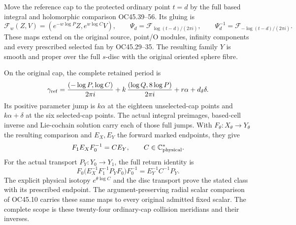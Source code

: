 \begin{theorem}
Move the reference cap to the protected ordinary point \(t=d\)
by the full based integral and holomorphic comparison
OC45.39--56. Its gluing is
\[
\mathcal F_w(Z,V)=(e^{-w\log P}Z,e^{w\log C}V),\qquad
\Psi_d=\mathcal F_{\log(t-d)/(2\pi i)},\qquad
\Psi_d^{-1}=\mathcal F_{-\log(t-d)/(2\pi i)}.
\]
These maps extend on the original source, point/O modules,
infinity components and every prescribed selected fan by
OC45.29--35. The resulting family \(Y\) is smooth and proper
over the full \(s\)-disc with the original oriented sphere fibre.

On the original cap, the complete retained period is
\[
\gamma_{\rm ref}
=\frac{(-\log P,\log C)}{2\pi i}
+k\,\frac{(\log Q,8\log P)}{2\pi i}
+r\alpha+d_\delta\delta .
\]
Its positive parameter jump is \(k\alpha\) at the eighteen
unselected-cap points and \(k\alpha+\delta\) at the six
selected-cap points. The actual integral preimages, based-cell
inverse and Lie-cochain solution carry each of those full jumps.
With \(F_\theta:X_\theta\to Y_\theta\) the resulting comparison
and \(E_X,E_Y\) the forward marked endpoints, they give
\[
F_1E_XF_0^{-1}=CE_Y,\qquad
C\in\mathbb C^*_{\rm physical}.
\]
For the actual transport \(P_Y:Y_0\to Y_1\), the full return
identity is
\[
F_0\bigl(E_X^{-1}F_1^{-1}P_YF_0\bigr)F_0^{-1}
=E_Y^{-1}C^{-1}P_Y .
\]
The explicit physical isotopy \(e^{\theta\log C}\) and the
disc transport prove the stated class with its prescribed
endpoint. The argument-preserving radial scalar comparison
of OC45.10 carries these same maps to every original admitted
fixed scalar. The complete scope is these twenty-four
ordinary-cap collision meridians and their inverses.
\end{theorem}
